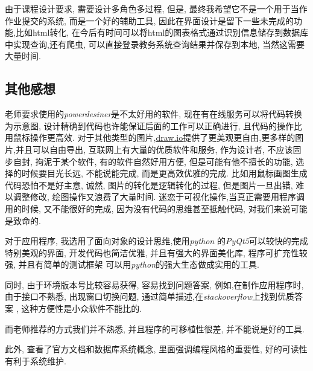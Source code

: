 \documentclass{myreport}
\begin{document}
    由于课程设计要求, 需要设计多角色多过程,
    但是, 最终我希望它不是一个用于当作作业提交的系统,
    而是一个好的辅助工具, 因此在界面设计是留下一些未完成的功能,比如html转化, 在今后有时间可以将html的图表格式通过识别信息储存到数据库中实现查询,还有爬虫, 可以直接登录教务系统查询结果并保存到本地, 当然这需要大量时间.
  \subsection{其他感想}

    老师要求使用的\emph{powerdesiner}是不太好用的软件,
    现在有在线服务可以将代码转换为示意图,
    设计精确到代码也许能保证后面的工作可以正确进行,
    且代码的操作比用鼠标操作更高效.
    对于其他类型的图片,\url{draw.io}提供了更美观更自由,更多样的图片,并且可以自由导出,
    互联网上有大量的优质软件和服务,
    作为设计者, 不应该固步自封, 拘泥于某个软件,
    有的软件自然好用方便, 但是可能有他不擅长的功能,
    选择的时候要目光长远, 不能说能完成,
    而是更高效优雅的完成.
    比如用鼠标画图生成代码恐怕不是好主意,
    诚然, 图片的转化是逻辑转化的过程,
    但是图片一旦出错, 难以调整修改,
    绘图操作又浪费了大量时间.
    迷恋于可视化操作,当真正需要用程序调用的时候,
    又不能很好的完成,
    因为没有代码的思维甚至抵触代码,
    对我们来说可能是致命的.


    对于应用程序, 我选用了面向对象的设计思维,使用\emph{python}
    的\emph{PyQt5}可以较快的完成特别美观的界面,
    开发代码也简洁优雅, 并且有强大的界面美化库,
    程序可扩充性较强,
    并且有简单的测试框架
    可以用\emph{python}的强大生态做成实用的工具.

    同时, 由于环境版本号比较容易获得, 容易找到问题答案,
    例如,在制作应用程序时, 由于接口不熟悉,
    出现窗口切换问题,
    通过简单描述,在\emph{stackoverflow}上找到优质答案
    ,
    这种方便性是小众软件不能比的.

    而老师推荐的方式我们并不熟悉,
    并且程序的可移植性很差,
    并不能说是好的工具.

    此外, 查看了官方文档和数据库系统概念,
    里面强调编程风格的重要性,
    好的可读性有利于系统维护.



\end{document}
